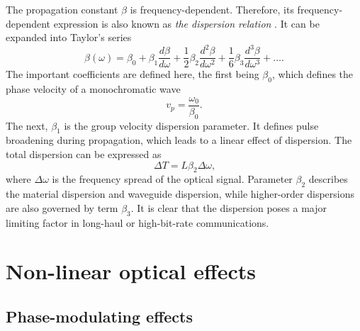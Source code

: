 \documentclass{standalone}
\begin{document}
The propagation constant $\beta$ is frequency-dependent. Therefore, its frequency-dependent expression is also known as \textit{the dispersion relation} \cite{chalmers:foc}. It can be expanded into Taylor's series
\begin{equation}
\beta(\omega) = \beta_0 + \beta_1 \frac{d \beta}{d \omega} + \frac{1}{2} \beta_2 \frac{d^2 \beta}{d \omega^2} + \frac{1}{6} \beta_3 \frac{d^3 \beta}{d \omega^3} + \dots \textrm{.}
\end{equation}
The important coefficients are defined here, the first being $\beta_0$, which defines the phase velocity of a monochromatic wave
\begin{equation}
v_p = \frac{\omega_0}{\beta_0} \textrm{.}
\end{equation}
The next, $\beta_1$ is the group velocity dispersion parameter. It defines pulse broadening during propagation, which leads to a linear effect of dispersion. The total dispersion can be expressed as
\begin{equation}
\varDelta T = L \beta_2 \varDelta \omega \textrm{,}
\end{equation}
where $\varDelta \omega$ is the frequency spread of the optical signal. Parameter $\beta_2$ describes the material dispersion and waveguide dispersion, while higher-order dispersions are also governed by term $\beta_3$. It is clear that the dispersion poses a major limiting factor in long-haul or high-bit-rate communications.

\section{Non-linear optical effects}

\subsection{Phase-modulating effects}
\end{document}
